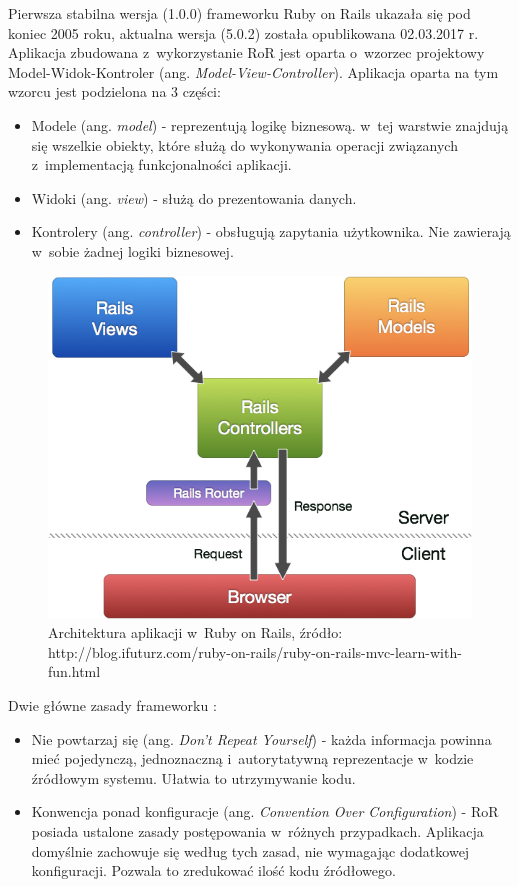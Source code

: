 \documentclass[printmode]{mgr}
\begin{document}
Pierwsza stabilna wersja (1.0.0) frameworku Ruby on Rails ukazała się pod koniec 2005 roku, aktualna wersja (5.0.2) została opublikowana 02.03.2017 r. Aplikacja zbudowana z~wykorzystanie RoR jest oparta o~wzorzec projektowy Model-Widok-Kontroler \cite{rails_agile} (ang. \textit{Model-View-Controller}). Aplikacja oparta na tym wzorcu jest podzielona na 3 części:
\begin{itemize}
  \item Modele (ang. \textit{model}) - reprezentują logikę biznesową. w~tej warstwie znajdują się wszelkie obiekty, które służą do wykonywania operacji związanych z~implementacją funkcjonalności aplikacji.
  \item Widoki (ang. \textit{view}) - służą do prezentowania danych. 
  \item Kontrolery (ang. \textit{controller}) - obsługują zapytania użytkownika. Nie zawierają w~sobie żadnej logiki biznesowej.
\end{itemize}

\begin{figure}[H]
  \centering
  \includegraphics[width=1\linewidth]{pictures/rails_mvc}
  \caption{Architektura aplikacji w~Ruby on Rails, źródło: http://blog.ifuturz.com/ruby-on-rails/ruby-on-rails-mvc-learn-with-fun.html}
  \label{fig:rails_mvc}
\end{figure}
\newpage
Dwie główne zasady frameworku \cite{doc_rails}:

\begin{itemize}
  \item Nie powtarzaj się (ang. \textit{Don't Repeat Yourself}) - każda informacja powinna mieć pojedynczą, jednoznaczną i~autorytatywną reprezentacje w~kodzie źródłowym systemu. Ułatwia to utrzymywanie kodu.
  \item Konwencja ponad konfiguracje (ang. \textit{Convention Over Configuration}) - RoR posiada ustalone zasady postępowania w~różnych przypadkach. Aplikacja domyślnie zachowuje się według tych zasad, nie wymagając dodatkowej konfiguracji. Pozwala to zredukować ilość kodu źródłowego.
\end{itemize}
\end{document}
